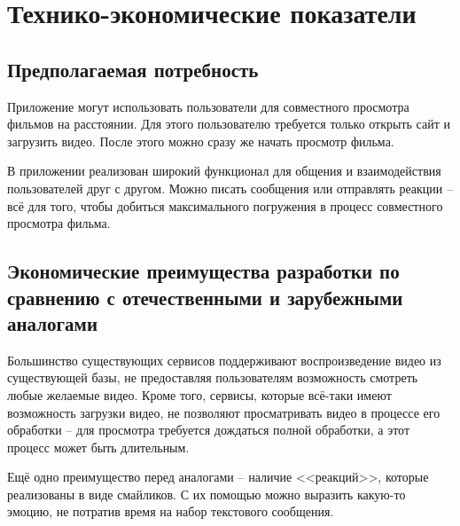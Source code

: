 \section{Технико-экономические показатели}

\subsection{Предполагаемая потребность}

Приложение могут использовать пользователи для совместного просмотра фильмов на расстоянии.
Для этого пользователю требуется только открыть сайт и загрузить видео.
После этого можно сразу же начать просмотр фильма.

В приложении реализован широкий функционал для общения и взаимодействия пользователей друг с другом.
Можно писать сообщения или отправлять реакции -- всё для того, чтобы добиться максимального погружения в процесс совместного просмотра фильма.

\subsection{Экономические преимущества разработки по сравнению с отечественными и зарубежными аналогами}

Большинство существующих сервисов поддерживают воспроизведение видео из существующей базы, не предоставляя пользователям возможность смотреть любые желаемые видео.
Кроме того, сервисы, которые всё-таки имеют возможность загрузки видео, не позволяют просматривать видео в процессе его обработки -- для просмотра требуется дождаться полной обработки, а этот процесс может быть длительным.

Ещё одно преимущество перед аналогами -- наличие <<реакций>>, которые реализованы в виде смайликов.
С их помощью можно выразить какую-то эмоцию, не потратив время на набор текстового сообщения.